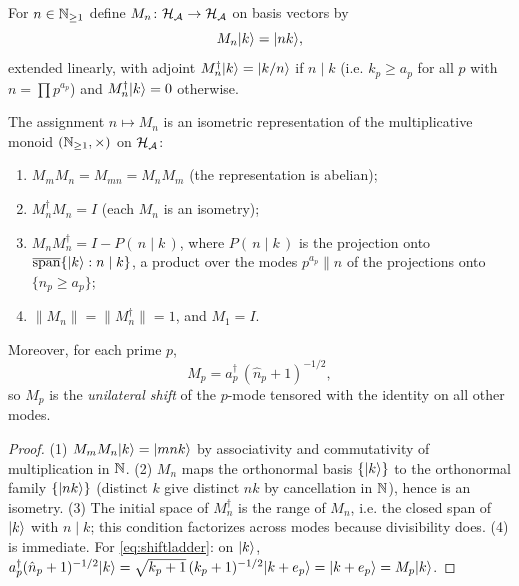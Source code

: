 \begin{definition}\label{def:multiplication}
For $n\in\mathbb{N}_{\geq1}$ define $M_{n}\colon\mathcal{H}_{\mathcal{A}}\to\mathcal{H}_{\mathcal{A}}$ on basis
vectors by
\begin{equation}
M_{n}\lvert k\rangle=\lvert nk\rangle,
\end{equation}
extended linearly, with adjoint $M_{n}^{\dagger}\lvert k\rangle=\lvert k/n\rangle$ if $n\mid k$ (i.e.
$k_{p}\geq a_{p}$ for all $p$ with $n=\prod p^{a_{p}}$) and $M_{n}^{\dagger}\lvert k\rangle=0$
otherwise.
\end{definition}

\begin{proposition}\label{prop:monoidrep}
The assignment $n\mapsto M_{n}$ is an isometric representation of the multiplicative monoid
$(\mathbb{N}_{\geq1},\times)$ on $\mathcal{H}_{\mathcal{A}}$:
\begin{enumerate}[leftmargin=1.6em]
\item $M_{m}M_{n}=M_{mn}=M_{n}M_{m}$ (the representation is abelian);
\item $M_{n}^{\dagger}M_{n}=I$ (each $M_{n}$ is an isometry);
\item $M_{n}M_{n}^{\dagger}=I-P(\,n\mid k\,)$, where $P(\,n\mid k\,)$ is the projection onto
$\overline{\mathrm{span}}\{\lvert k\rangle: n\mid k\}$, a product over the modes $p^{a_{p}}\| n$ of
the projections onto $\{\hat n_{p}\geq a_{p}\}$;
\item $\|M_{n}\|=\|M_{n}^{\dagger}\|=1$, and $M_{1}=I$.
\end{enumerate}
Moreover, for each prime $p$,
\begin{equation}\label{eq:shiftladder}
M_{p}=a_{p}^{\dagger}\,(\hat n_{p}+1)^{-1/2},
\end{equation}
so $M_{p}$ is the \emph{unilateral shift} of the $p$-mode tensored with the identity on all
other modes.
\end{proposition}

\begin{proof}
(1) $M_{m}M_{n}\lvert k\rangle=\lvert mnk\rangle$ by associativity and commutativity of multiplication in
$\mathbb{N}$. (2) $M_{n}$ maps the orthonormal basis $\{\lvert k\rangle\}$ to the orthonormal family
$\{\lvert nk\rangle\}$ (distinct $k$ give distinct $nk$ by cancellation in $\mathbb{N}$), hence is an
isometry. (3) The initial space of $M_{n}^{\dagger}$ is the range of $M_{n}$, i.e. the closed
span of $\lvert k\rangle$ with $n\mid k$; this condition factorizes across modes because divisibility
does. (4) is immediate. For \eqref{eq:shiftladder}: on $\lvert k\rangle$,
$a_{p}^{\dagger}(\hat n_{p}+1)^{-1/2}\lvert k\rangle=\sqrt{k_{p}+1}\,(k_{p}+1)^{-1/2}\lvert k+e_{p}\rangle
=\lvert k+e_{p}\rangle=M_{p}\lvert k\rangle$.
\end{proof}

